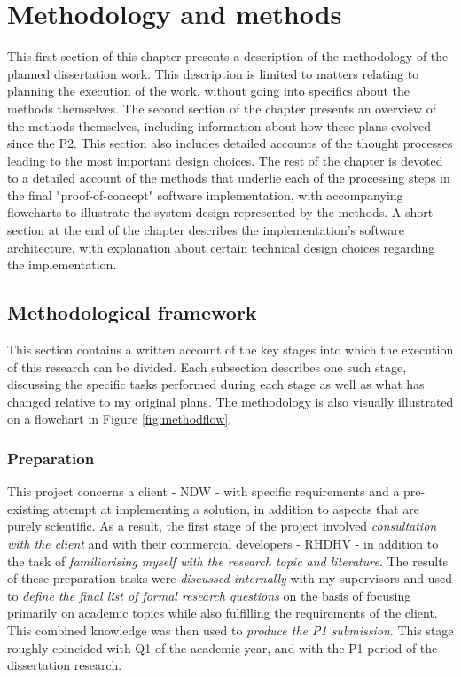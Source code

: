 
\chapter{Methodology and methods}
\label{chap:mm}

This first section of this chapter presents a description of the methodology of the planned dissertation work. This description is limited to matters relating to planning the execution of the work, without going into specifics about the methods themselves. The second section of the chapter presents an overview of the methods themselves, including information about how these plans evolved since the P2. This section also includes detailed accounts of the thought processes leading to the most important design choices. The rest of the chapter is devoted to a detailed account of the methods that underlie each of the processing steps in the final "proof-of-concept" software implementation, with accompanying flowcharts to illustrate the system design represented by the methods. A short section at the end of the chapter describes the implementation's software architecture, with explanation about certain technical design choices regarding the implementation.

\section{Methodological framework}
\label{sec:methodology}

This section contains a written account of the key stages into which the execution of this research can be divided. Each subsection describes one such stage, discussing the specific tasks performed during each stage as well as what has changed relative to my original plans. The methodology is also visually illustrated on a flowchart in Figure \ref{fig:methodflow}.

\subsection{Preparation}
\label{sub:preparation}

This project concerns a client - NDW - with specific requirements and a pre-existing attempt at implementing a solution, in addition to aspects that are purely scientific. As a result, the first stage of the project involved \textit{consultation with the client} and with their commercial developers - RHDHV - in addition to the task of \textit{familiarising myself with the research topic and literature}. The results of these preparation tasks were \textit{discussed internally} with my supervisors and used to \textit{define the final list of formal research questions} on the basis of focusing primarily on academic topics while also fulfilling the requirements of the client. This combined knowledge was then used to \textit{produce the P1 submission}. This stage roughly coincided with Q1 of the academic year, and with the P1 period of the dissertation research.

